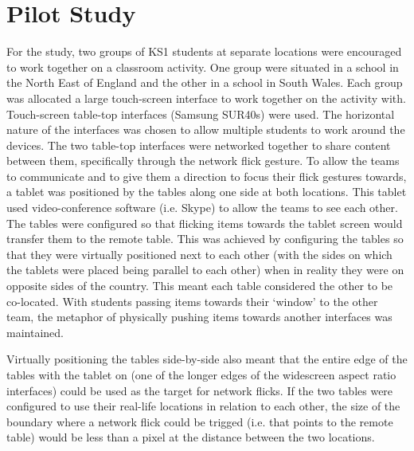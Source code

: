 \documentclass[a4paper,11pt]{article}
\begin{document}


\section{Pilot Study}

For the study, two groups of KS1 students at separate locations were encouraged to work together on a classroom activity. %
One group were situated in a school in the North East of England and the other in a school in South Wales.
Each group was allocated a large touch-screen interface to work together on the activity with.
Touch-screen table-top interfaces (Samsung SUR40s) were used.
The horizontal nature of the interfaces was chosen to allow multiple students to work around the devices.
The two table-top interfaces were networked together to share content between them, specifically through the network flick gesture.
To allow the teams to communicate and to give them a direction to focus their flick gestures towards, a tablet was positioned by the tables along one side at both locations.
This tablet used video-conference software (i.e.
Skype) to allow the teams to see each other.
The tables were configured so that flicking items towards the tablet screen would transfer them to the remote table.
This was achieved by configuring the tables so that they were virtually positioned next to each other (with the sides on which the tablets were placed being parallel to each other) when in reality they were on opposite sides of the country.
This meant each table considered the other to be co-located.
With students passing items towards their `window' to the other team, the metaphor of physically pushing items towards another interfaces was maintained.

Virtually positioning the tables side-by-side also meant that the entire edge of the tables with the tablet on (one of the longer edges of the widescreen aspect ratio interfaces) could be used as the target for network flicks.
If the two tables were configured to use their real-life locations in relation to each other, the size of the boundary where a network flick could be trigged (i.e.
that points to the remote table) would be less than a pixel at the distance between the two locations.
\end{document}
